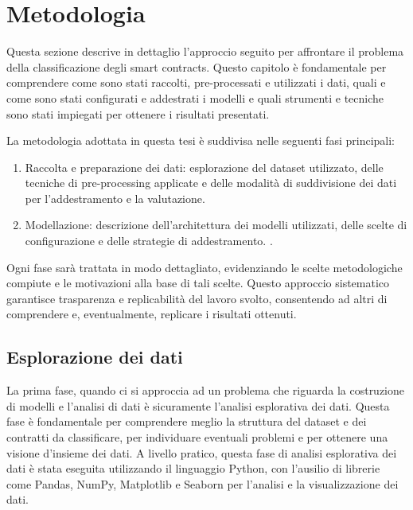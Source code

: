 \documentclass[../../Thesis.tex]{subfiles}
\begin{document}
\chapter{Metodologia}
Questa sezione descrive in dettaglio l'approccio seguito per affrontare il problema della classificazione degli smart contracts. Questo capitolo è fondamentale per comprendere come sono stati raccolti, pre-processati e utilizzati i dati, quali e come sono stati configurati e addestrati i modelli e quali strumenti e tecniche sono stati impiegati per ottenere i risultati presentati.

La metodologia adottata in questa tesi è suddivisa nelle seguenti fasi principali:
\begin{enumerate}
    \item Raccolta e preparazione dei dati: esplorazione del dataset utilizzato, delle tecniche di pre-processing applicate e delle modalità di suddivisione dei dati per l'addestramento e la valutazione.
    \item Modellazione: descrizione dell'architettura dei modelli utilizzati, delle scelte di configurazione e delle strategie di addestramento.
.
\end{enumerate}
Ogni fase sarà trattata in modo dettagliato, evidenziando le scelte metodologiche compiute e le motivazioni alla base di tali scelte. Questo approccio sistematico garantisce trasparenza e replicabilità del lavoro svolto, consentendo ad altri  di comprendere e, eventualmente, replicare i risultati ottenuti.
    
\section{Esplorazione dei dati}
\label{sec:eda}
La prima fase, quando ci si approccia ad un problema che riguarda la costruzione di modelli e l'analisi di dati è sicuramente l'analisi esplorativa dei dati. Questa fase è fondamentale per comprendere meglio la struttura del dataset e dei contratti da classificare, per individuare eventuali problemi e per ottenere una visione d'insieme dei dati. A livello pratico, questa fase di analisi esplorativa dei dati è stata eseguita utilizzando il linguaggio Python, con l'ausilio di librerie come Pandas, NumPy, Matplotlib e Seaborn per l'analisi e la visualizzazione dei dati.
\end{document}
